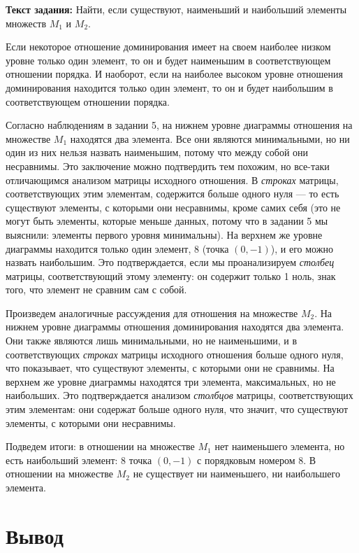 \documentclass[12pt]{article}
\begin{document}
	{\bf Текст задания:} Найти, если существуют, наименьший и наибольший элементы множеств $M_1$ и $M_2$.
	
	Если некоторое отношение доминирования имеет на своем наиболее низком уровне только один элемент, то он и будет наименьшим в соответствующем отношении порядка. И наоборот, если на наиболее высоком уровне отношения доминирования находится только один элемент, то он и будет наибольшим в соответствующем отношении порядка.
	
	Согласно наблюдениям в задании 5, на нижнем уровне диаграммы отношения на множестве $M_1$ находятся два элемента. Все они являются минимальными, но ни один из них нельзя назвать наименьшим, потому что между собой они несравнимы. Это заключение можно подтвердить тем похожим, но все-таки отличающимся анализом матрицы исходного отношения. В {\it строках} матрицы, соответствующих этим элементам, содержится больше одного нуля --- то есть существуют элементы, с которыми они несравнимы, кроме самих себя (это не могут быть элементы, которые меньше данных, потому что в задании 5 мы выяснили: элементы первого уровня минимальны). На верхнем же уровне диаграммы находится только один элемент, 8 (точка $(0, -1)$), и его можно назвать наибольшим. Это подтверждается, если мы проанализируем {\it столбец} матрицы, соответствующий этому элементу: он содержит только 1 ноль, знак того, что элемент не сравним сам с собой.
	
	Произведем аналогичные рассуждения для отношения на множестве $M_2$. На нижнем уровне диаграммы отношения доминирования находятся два элемента. Они также являются лишь минимальными, но не наименьшими, и в соответствующих {\it строках} матрицы исходного отношения больше одного нуля, что показывает, что существуют элементы, с которыми они не сравнимы. На верхнем же уровне диаграммы находятся три элемента, максимальных, но не наибольших. Это подтверждается анализом {\it столбцов} матрицы, соответствующих этим элементам: они содержат больше одного нуля, что значит, что существуют элементы, с которыми они несравнимы.
	
	Подведем итоги: в отношении на множестве $M_1$ нет наименьшего элемента, но есть наибольший элемент: 8 точка $(0, -1)$ с порядковым номером 8. В отношении на множестве $M_2$ не существует ни наименьшего, ни наибольшего элемента.
	
	\section{Вывод}
	\label{final}
	
\end{document}
